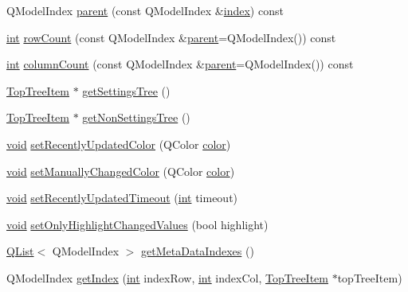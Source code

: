 \begin{DoxyCompactItemize}
\item 
Q\-Model\-Index \hyperlink{group___u_a_v_object_browser_plugin_ga8d23a2cd6d6b785179ebd12426f142e3}{parent} (const Q\-Model\-Index \&\hyperlink{glext_8h_ab47dd9958bcadea08866b42bf358e95e}{index}) const 
\item 
\hyperlink{ioapi_8h_a787fa3cf048117ba7123753c1e74fcd6}{int} \hyperlink{group___u_a_v_object_browser_plugin_ga77552bcb5a7016909e6de111fb100744}{row\-Count} (const Q\-Model\-Index \&\hyperlink{group___u_a_v_object_browser_plugin_ga8d23a2cd6d6b785179ebd12426f142e3}{parent}=Q\-Model\-Index()) const 
\item 
\hyperlink{ioapi_8h_a787fa3cf048117ba7123753c1e74fcd6}{int} \hyperlink{group___u_a_v_object_browser_plugin_gafe7737e489b53e92c325a27785e690cd}{column\-Count} (const Q\-Model\-Index \&\hyperlink{group___u_a_v_object_browser_plugin_ga8d23a2cd6d6b785179ebd12426f142e3}{parent}=Q\-Model\-Index()) const 
\item 
\hyperlink{class_top_tree_item}{Top\-Tree\-Item} $\ast$ \hyperlink{group___u_a_v_object_browser_plugin_ga65564af37704d64b262417b4e5795b76}{get\-Settings\-Tree} ()
\item 
\hyperlink{class_top_tree_item}{Top\-Tree\-Item} $\ast$ \hyperlink{group___u_a_v_object_browser_plugin_gaba7711ed458572937f031011b8ad9842}{get\-Non\-Settings\-Tree} ()
\item 
\hyperlink{group___u_a_v_objects_plugin_ga444cf2ff3f0ecbe028adce838d373f5c}{void} \hyperlink{group___u_a_v_object_browser_plugin_gac3ae57e6538de964006edcdb0affb776}{set\-Recently\-Updated\-Color} (Q\-Color \hyperlink{glext_8h_a3ea846f998d64f079b86052b6c4193a8}{color})
\item 
\hyperlink{group___u_a_v_objects_plugin_ga444cf2ff3f0ecbe028adce838d373f5c}{void} \hyperlink{group___u_a_v_object_browser_plugin_ga9bc5e49ee3b742c3f1b9ff05b71f7d7e}{set\-Manually\-Changed\-Color} (Q\-Color \hyperlink{glext_8h_a3ea846f998d64f079b86052b6c4193a8}{color})
\item 
\hyperlink{group___u_a_v_objects_plugin_ga444cf2ff3f0ecbe028adce838d373f5c}{void} \hyperlink{group___u_a_v_object_browser_plugin_ga2b730043ef2a9acc337b2a6864894456}{set\-Recently\-Updated\-Timeout} (\hyperlink{ioapi_8h_a787fa3cf048117ba7123753c1e74fcd6}{int} timeout)
\item 
\hyperlink{group___u_a_v_objects_plugin_ga444cf2ff3f0ecbe028adce838d373f5c}{void} \hyperlink{group___u_a_v_object_browser_plugin_gaef0cd94aa30b16dabefb791a32542b10}{set\-Only\-Highlight\-Changed\-Values} (bool highlight)
\item 
\hyperlink{class_q_list}{Q\-List}$<$ Q\-Model\-Index $>$ \hyperlink{group___u_a_v_object_browser_plugin_ga96556d7a4724a18462706ac54d6cc761}{get\-Meta\-Data\-Indexes} ()
\item 
Q\-Model\-Index \hyperlink{group___u_a_v_object_browser_plugin_gaadbcc539338a28f21acc570915b786df}{get\-Index} (\hyperlink{ioapi_8h_a787fa3cf048117ba7123753c1e74fcd6}{int} index\-Row, \hyperlink{ioapi_8h_a787fa3cf048117ba7123753c1e74fcd6}{int} index\-Col, \hyperlink{class_top_tree_item}{Top\-Tree\-Item} $\ast$top\-Tree\-Item)
\end{DoxyCompactItemize}


